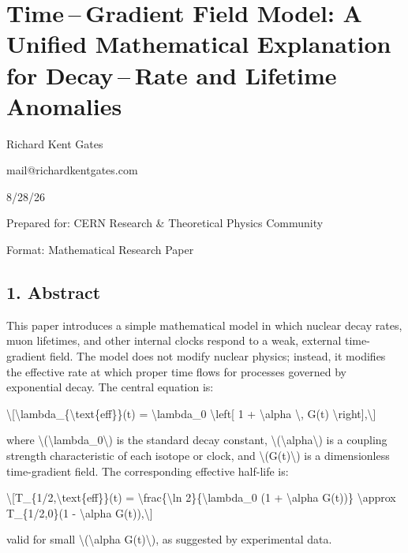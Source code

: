 \documentclass[
  10pt,
]{article}
\author{}
\date{}
\begin{document}
\hypertarget{time-gradient-field-model-a-unified-mathematical-explanation-for-decay-rate-and-lifetime-anomalies}{%
\section{Time -- Gradient Field Model: A Unified Mathematical
Explanation for Decay -- Rate and Lifetime
Anomalies}\label{time-gradient-field-model-a-unified-mathematical-explanation-for-decay-rate-and-lifetime-anomalies}}

Richard Kent Gates

mail@richardkentgates.com

8/28/26

Prepared for: CERN Research \& Theoretical Physics Community

Format: Mathematical Research Paper

\hypertarget{abstract}{%
\subsection{1. Abstract}\label{abstract}}

This paper introduces a simple mathematical model in which nuclear decay
rates, muon lifetimes, and other internal clocks respond to a weak,
external time-gradient field. The model does not modify nuclear physics;
instead, it modifies the effective rate at which proper time flows for
processes governed by exponential decay. The central equation is:

\textbackslash{[}\textbackslash lambda\_\{\textbackslash text\{eff\}\}(t)
= \textbackslash lambda\_0 \textbackslash left{[} 1 +
\textbackslash alpha \textbackslash, G(t)
\textbackslash right{]},\textbackslash{]}

where \textbackslash(\textbackslash lambda\_0\textbackslash) is the
standard decay constant,
\textbackslash(\textbackslash alpha\textbackslash) is a coupling
strength characteristic of each isotope or clock, and
\textbackslash(G(t)\textbackslash) is a dimensionless time-gradient
field. The corresponding effective half-life is:

\textbackslash{[}T\_\{1/2,\textbackslash text\{eff\}\}(t) =
\textbackslash frac\{\textbackslash ln 2\}\{\textbackslash lambda\_0 (1
+ \textbackslash alpha G(t))\} \textbackslash approx T\_\{1/2,0\}(1 -
\textbackslash alpha G(t)),\textbackslash{]}

valid for small \textbackslash(\textbackslash alpha G(t)\textbackslash),
as suggested by experimental data.
\end{document}

